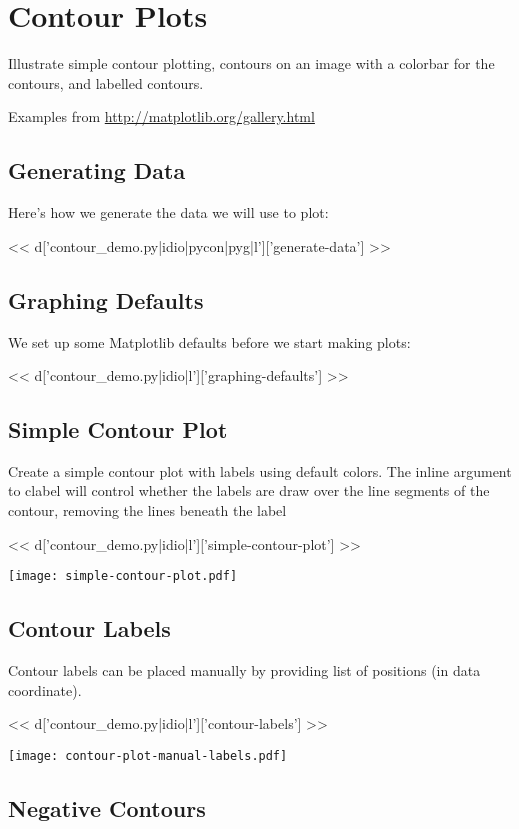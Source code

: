 \section{Contour Plots}

Illustrate simple contour plotting, contours on an image with
a colorbar for the contours, and labelled contours.

Examples from \url{http://matplotlib.org/gallery.html}

\subsection{Generating Data}

Here's how we generate the data we will use to plot:

<< d['contour_demo.py|idio|pycon|pyg|l']['generate-data'] >>

\subsection{Graphing Defaults}

We set up some Matplotlib defaults before we start making plots:

<< d['contour_demo.py|idio|l']['graphing-defaults'] >>

\subsection{Simple Contour Plot}

Create a simple contour plot with labels using default colors.  The
inline argument to clabel will control whether the labels are draw
over the line segments of the contour, removing the lines beneath
the label

<< d['contour_demo.py|idio|l']['simple-contour-plot'] >>

\texttt{[image: simple-contour-plot.pdf]}

\subsection{Contour Labels}

Contour labels can be placed manually by providing list of positions (in data coordinate).

<< d['contour_demo.py|idio|l']['contour-labels'] >>

\texttt{[image: contour-plot-manual-labels.pdf]}

\subsection{Negative Contours}

